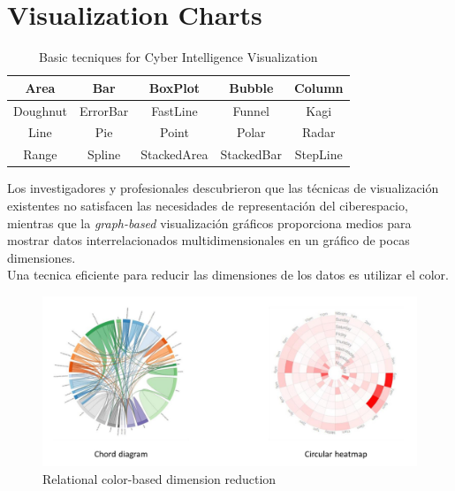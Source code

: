 \section{Visualization Charts}
\begin{table}[htbp]
   \centering
   \begin{tabular}{|c|c|c|c|c|}
\hline Area     & Bar       & BoxPlot      & Bubble       & Column \\
\hline Doughnut & ErrorBar  & FastLine     & Funnel       & Kagi \\
\hline Line     & Pie       & Point        & Polar        & Radar \\
\hline Range    & Spline    & StackedArea  & StackedBar   & StepLine\\
\hline
   \end{tabular}
   \caption{Basic tecniques for Cyber Intelligence Visualization}
   \label{tab:03/tecnicasVisualizacion}
\end{table}

\begin{paracol}{2}
   
   Los investigadores y profesionales descubrieron que las técnicas de visualización existentes no satisfacen las necesidades de representación del ciberespacio, mientras que la \emph{graph-based} visualización gráficos proporciona medios para mostrar datos interrelacionados multidimensionales en un gráfico de pocas dimensiones.\\
   Una tecnica eficiente para reducir las dimensiones de los datos es utilizar el color.

   \switchcolumn
   \begin{figure}[htbp]
      \centering
      \includegraphics{images/03/color.png}
      \caption{Relational color-based dimension reduction}
      \label{fig:03/color}
   \end{figure}
\end{paracol}

